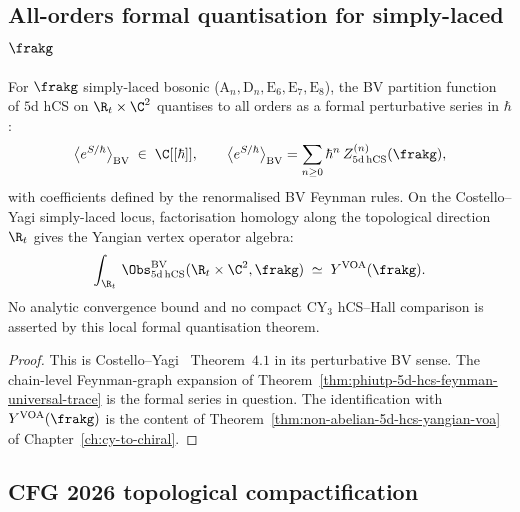 \subsection{All-orders formal quantisation for simply-laced \texorpdfstring{$\frakg$}{g}}
\label{subsec:phiutp-all-orders-convergence}

\begin{theorem}
\label{thm:phiutp-all-orders-costello-yagi}
For $\frakg$ simply-laced bosonic \textup{(}$\mathrm{A}_n, \mathrm{D}_n,
\mathrm{E}_6, \mathrm{E}_7, \mathrm{E}_8$\textup{)}, the BV partition
function of $5$d hCS on $\R_t\times\C^2$ quantises to all orders as a
formal perturbative series in $\hbar$:
\[
 \bigl\langle e^{S/\hbar}\bigr\rangle_{\mathrm{BV}}
 \;\in\;
 \C[[\hbar]],
 \qquad
 \bigl\langle e^{S/\hbar}\bigr\rangle_{\mathrm{BV}}
 =
 \sum_{n\ge 0}\hbar^n\, Z^{(n)}_{5\mathrm{d\,hCS}}(\frakg),
\]
with coefficients defined by the renormalised BV Feynman rules. On the
Costello--Yagi simply-laced locus, factorisation homology along the
topological direction $\R_t$ gives the Yangian vertex operator algebra:
\[
 \int_{\R_t}\, \Obs^{\mathrm{BV}}_{5\mathrm{d\,hCS}}(\R_t\times\C^2, \frakg)
 \;\simeq\; Y^{\mathrm{VOA}}(\frakg).
\]
No analytic convergence bound and no compact CY$_3$ hCS--Hall
comparison is asserted by this local formal quantisation theorem.
\end{theorem}

\begin{proof}
This is Costello--Yagi~\cite{CostelloYagi2018} Theorem~$4.1$ in its
perturbative BV sense. The chain-level Feynman-graph expansion of
Theorem~\ref{thm:phiutp-5d-hcs-feynman-universal-trace} is the formal
series in question. The identification with $Y^{\mathrm{VOA}}(\frakg)$
is the content of
Theorem~\ref{thm:non-abelian-5d-hcs-yangian-voa} of
Chapter~\ref{ch:cy-to-chiral}.
\end{proof}

\subsection{CFG 2026 topological compactification}
\label{subsec:phiutp-cfg-topological-compactification}

